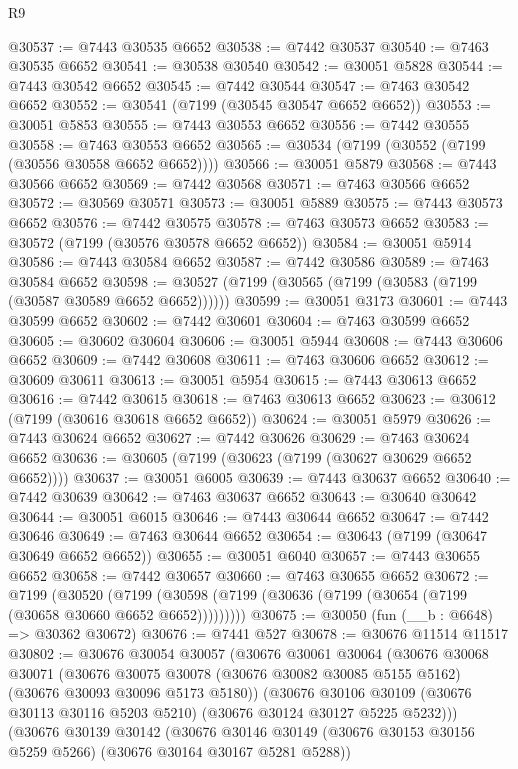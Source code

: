 \begin{lexlean}{R9}
\begin{coremodule}
@30537 := @7443 @30535 @6652
@30538 := @7442 @30537
@30540 := @7463 @30535 @6652
@30541 := @30538 @30540
@30542 := @30051 @5828
@30544 := @7443 @30542 @6652
@30545 := @7442 @30544
@30547 := @7463 @30542 @6652
@30552 := @30541 (@7199 (@30545 @30547 @6652 @6652))
@30553 := @30051 @5853
@30555 := @7443 @30553 @6652
@30556 := @7442 @30555
@30558 := @7463 @30553 @6652
@30565 := @30534 (@7199 (@30552 (@7199 (@30556 @30558 @6652 @6652))))
@30566 := @30051 @5879
@30568 := @7443 @30566 @6652
@30569 := @7442 @30568
@30571 := @7463 @30566 @6652
@30572 := @30569 @30571
@30573 := @30051 @5889
@30575 := @7443 @30573 @6652
@30576 := @7442 @30575
@30578 := @7463 @30573 @6652
@30583 := @30572 (@7199 (@30576 @30578 @6652 @6652))
@30584 := @30051 @5914
@30586 := @7443 @30584 @6652
@30587 := @7442 @30586
@30589 := @7463 @30584 @6652
@30598 := @30527 (@7199 (@30565 (@7199 (@30583 (@7199 (@30587 @30589 @6652 @6652))))))
@30599 := @30051 @3173
@30601 := @7443 @30599 @6652
@30602 := @7442 @30601
@30604 := @7463 @30599 @6652
@30605 := @30602 @30604
@30606 := @30051 @5944
@30608 := @7443 @30606 @6652
@30609 := @7442 @30608
@30611 := @7463 @30606 @6652
@30612 := @30609 @30611
@30613 := @30051 @5954
@30615 := @7443 @30613 @6652
@30616 := @7442 @30615
@30618 := @7463 @30613 @6652
@30623 := @30612 (@7199 (@30616 @30618 @6652 @6652))
@30624 := @30051 @5979
@30626 := @7443 @30624 @6652
@30627 := @7442 @30626
@30629 := @7463 @30624 @6652
@30636 := @30605 (@7199 (@30623 (@7199 (@30627 @30629 @6652 @6652))))
@30637 := @30051 @6005
@30639 := @7443 @30637 @6652
@30640 := @7442 @30639
@30642 := @7463 @30637 @6652
@30643 := @30640 @30642
@30644 := @30051 @6015
@30646 := @7443 @30644 @6652
@30647 := @7442 @30646
@30649 := @7463 @30644 @6652
@30654 := @30643 (@7199 (@30647 @30649 @6652 @6652))
@30655 := @30051 @6040
@30657 := @7443 @30655 @6652
@30658 := @7442 @30657
@30660 := @7463 @30655 @6652
@30672 := @7199
    (@30520 (@7199 (@30598 (@7199 (@30636 (@7199 (@30654 (@7199 (@30658 @30660 @6652 @6652)))))))))
@30675 := @30050 (fun (__b : @6648) => @30362 @30672)
@30676 := @7441 @527
@30678 := @30676 @11514 @11517
@30802 := @30676
    @30054
    @30057
    (@30676
      @30061
      @30064
      (@30676
        @30068
        @30071
        (@30676 @30075 @30078 (@30676 @30082 @30085 @5155 @5162) (@30676 @30093 @30096 @5173 @5180))
        (@30676
          @30106
          @30109
          (@30676 @30113 @30116 @5203 @5210)
          (@30676 @30124 @30127 @5225 @5232)))
      (@30676
        @30139
        @30142
        (@30676 @30146 @30149 (@30676 @30153 @30156 @5259 @5266) (@30676 @30164 @30167 @5281 @5288))

\end{coremodule}
\end{lexlean}
